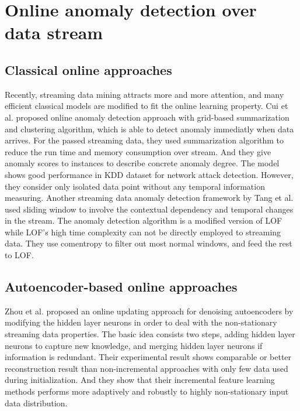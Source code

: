 \section{Online anomaly detection over data stream}
\label{sec: Online anomaly detection over data stream }


\subsection{Classical online approaches}
\label{sec:classical online approaches}

Recently, streaming data mining attracts more and more attention, and many efficient classical models are modified to fit the online learning property. Cui et al. \cite{cui} proposed online anomaly detection approach with grid-based summarization and clustering algorithm, which is able to detect anomaly immediatly when data arrives. For the passed streaming data, they used summarization algorithm to reduce the run time and memory consumption over stream. And they give anomaly scores to instances to describe concrete anomaly degree. The model shows good performance in KDD dataset for network attack detection. However, they consider only isolated data point without any temporal information measuring. Another streaming data anomaly detection framework by Tang et al. \cite{onlinelof} used sliding window to involve the contextual dependency and temporal changes in the stream. The anomaly detection algorithm is a modified version of LOF while LOF’s high time complexity can not be directly employed to streaming data. They use comentropy to filter out most normal windows, and feed the rest to LOF.

\subsection{Autoencoder-based online approaches}
\label{sec:Autoencoder-based online approaches }

Zhou et al. \cite{online} proposed an online updating approach for denoising autoencoders by modifying the hidden layer neurons in order to deal with the non-stationary streaming data properties. The basic idea consists two steps, adding hidden layer neurons to capture new knowledge, and merging hidden layer neurons if information is redundant. Their experimental result shows comparable or better reconstruction result than non-incremental approaches with only few data used during initialization. And they show that their incremental feature learning methods performs more adaptively and robustly to highly non-stationary input data distribution.\\

